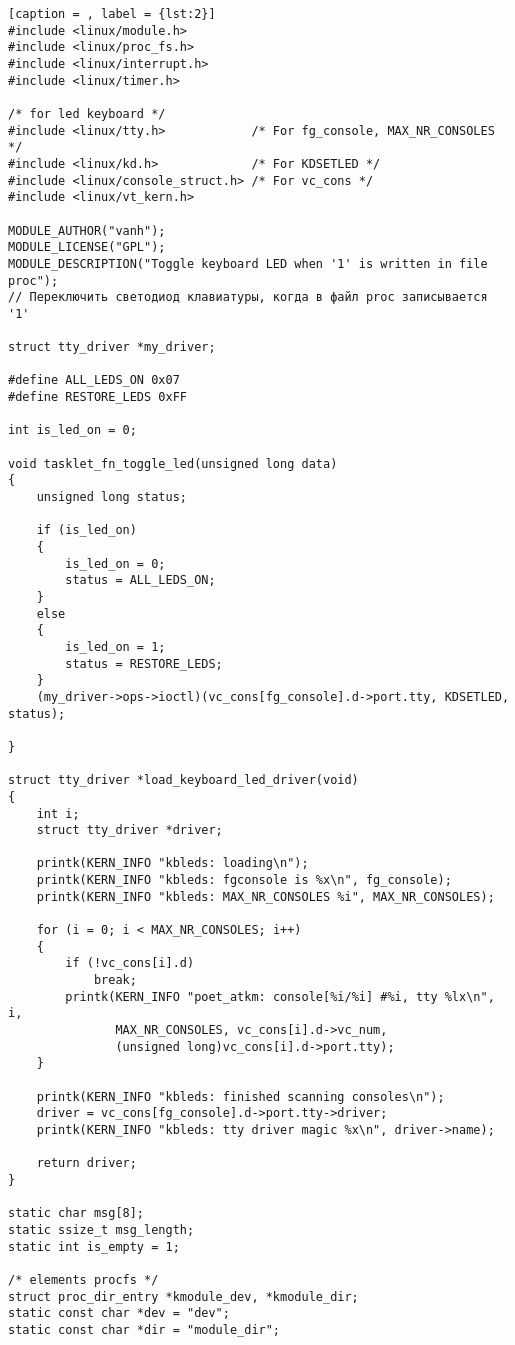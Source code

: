 \begin{lstlisting}[caption = , label = {lst:2}]
#include <linux/module.h>
#include <linux/proc_fs.h>
#include <linux/interrupt.h>
#include <linux/timer.h>

/* for led keyboard */
#include <linux/tty.h>            /* For fg_console, MAX_NR_CONSOLES */
#include <linux/kd.h>             /* For KDSETLED */
#include <linux/console_struct.h> /* For vc_cons */
#include <linux/vt_kern.h>

MODULE_AUTHOR("vanh");
MODULE_LICENSE("GPL");
MODULE_DESCRIPTION("Toggle keyboard LED when '1' is written in file proc");
// Переключить светодиод клавиатуры, когда в файл proc записывается '1'

struct tty_driver *my_driver;

#define ALL_LEDS_ON 0x07
#define RESTORE_LEDS 0xFF

int is_led_on = 0;

void tasklet_fn_toggle_led(unsigned long data)
{
    unsigned long status;

    if (is_led_on)
    {
        is_led_on = 0;
        status = ALL_LEDS_ON;
    }
    else
    {
        is_led_on = 1;
        status = RESTORE_LEDS;
    }
    (my_driver->ops->ioctl)(vc_cons[fg_console].d->port.tty, KDSETLED, status);

}

struct tty_driver *load_keyboard_led_driver(void)
{
    int i;
    struct tty_driver *driver;

    printk(KERN_INFO "kbleds: loading\n");
    printk(KERN_INFO "kbleds: fgconsole is %x\n", fg_console);
    printk(KERN_INFO "kbleds: MAX_NR_CONSOLES %i", MAX_NR_CONSOLES);
    
    for (i = 0; i < MAX_NR_CONSOLES; i++)
    {
        if (!vc_cons[i].d)
            break;
        printk(KERN_INFO "poet_atkm: console[%i/%i] #%i, tty %lx\n", i,
               MAX_NR_CONSOLES, vc_cons[i].d->vc_num,
               (unsigned long)vc_cons[i].d->port.tty);
    }

    printk(KERN_INFO "kbleds: finished scanning consoles\n");
    driver = vc_cons[fg_console].d->port.tty->driver;
    printk(KERN_INFO "kbleds: tty driver magic %x\n", driver->name);

    return driver;
}

static char msg[8];
static ssize_t msg_length;
static int is_empty = 1;

/* elements procfs */
struct proc_dir_entry *kmodule_dev, *kmodule_dir;
static const char *dev = "dev";
static const char *dir = "module_dir";


\end{lstlisting}
